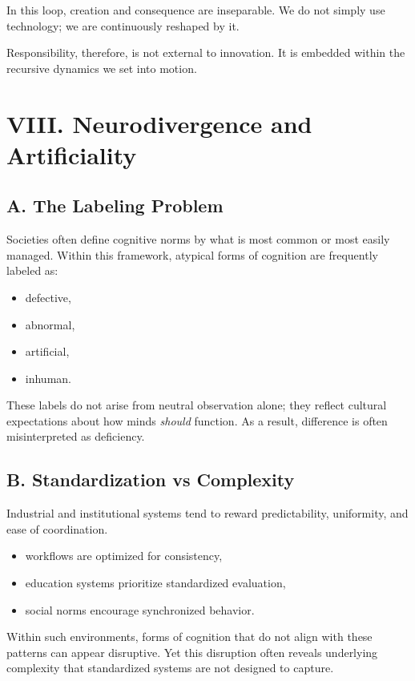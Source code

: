 \documentclass[12pt]{article}
\begin{document}
In this loop, creation and consequence are inseparable. We do not simply use technology; we are continuously reshaped by it.

Responsibility, therefore, is not external to innovation. It is embedded within the recursive dynamics we set into motion.

\section*{VIII. Neurodivergence and Artificiality}

\subsection*{A. The Labeling Problem}

Societies often define cognitive norms by what is most common or most easily managed. Within this framework, atypical forms of cognition are frequently labeled as:
\begin{itemize}
    \item defective,
    \item abnormal,
    \item artificial,
    \item inhuman.
\end{itemize}

These labels do not arise from neutral observation alone; they reflect cultural expectations about how minds \textit{should} function. As a result, difference is often misinterpreted as deficiency.

\subsection*{B. Standardization vs Complexity}

Industrial and institutional systems tend to reward predictability, uniformity, and ease of coordination.

\begin{itemize}
    \item workflows are optimized for consistency,
    \item education systems prioritize standardized evaluation,
    \item social norms encourage synchronized behavior.
\end{itemize}

Within such environments, forms of cognition that do not align with these patterns can appear disruptive. Yet this disruption often reveals underlying complexity that standardized systems are not designed to capture.
\end{document}
